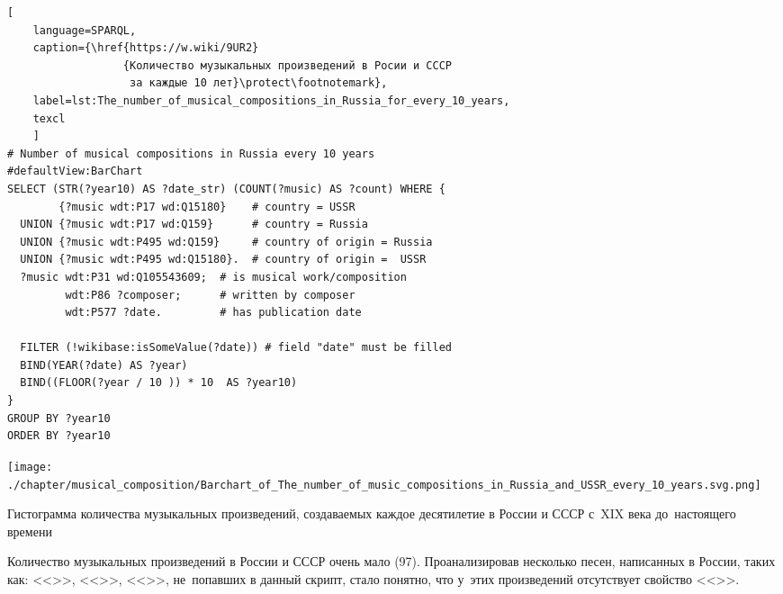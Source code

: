 \begin{lstlisting}[ 
    language=SPARQL,
    caption={\href{https://w.wiki/9UR2}
                  {Количество музыкальных произведений в Росии и СССР 
                   за каждые 10 лет}\protect\footnotemark},
    label=lst:The_number_of_musical_compositions_in_Russia_for_every_10_years,
    texcl 
    ]
# Number of musical compositions in Russia every 10 years
#defaultView:BarChart
SELECT (STR(?year10) AS ?date_str) (COUNT(?music) AS ?count) WHERE {
        {?music wdt:P17 wd:Q15180}    # country = USSR
  UNION {?music wdt:P17 wd:Q159}      # country = Russia
  UNION {?music wdt:P495 wd:Q159}     # country of origin = Russia
  UNION {?music wdt:P495 wd:Q15180}.  # country of origin =  USSR
  ?music wdt:P31 wd:Q105543609;  # is musical work/composition
         wdt:P86 ?composer;      # written by composer
         wdt:P577 ?date.         # has publication date

  FILTER (!wikibase:isSomeValue(?date)) # field "date" must be filled
  BIND(YEAR(?date) AS ?year)
  BIND((FLOOR(?year / 10 )) * 10  AS ?year10)
}
GROUP BY ?year10
ORDER BY ?year10
\end{lstlisting}%



\newpage

\begin{marginfigure}[0\baselineskip]
	\texttt{[image: ./chapter/musical\_composition/Barchart\_of\_The\_number\_of\_music\_compositions\_in\_Russia\_and\_USSR\_every\_10\_years.svg.png]}
    \vspace{-7pt}
	\caption{Гистограмма количества музыкальных произведений, 
             создаваемых каждое десятилетие в России и СССР с~XIX века до~настоящего времени}%
	\label{fig:diagram_10_yearsRussia}%

\end{marginfigure}

Количество музыкальных произведений в России и СССР очень мало (97). 
Проанализировав несколько песен, написанных в России, таких как: 
<<>>, 
<<>>, 
<<>>, 
не~попавших в данный скрипт, стало понятно, 
что у~этих произведений отсутствует свойство <<>>.

